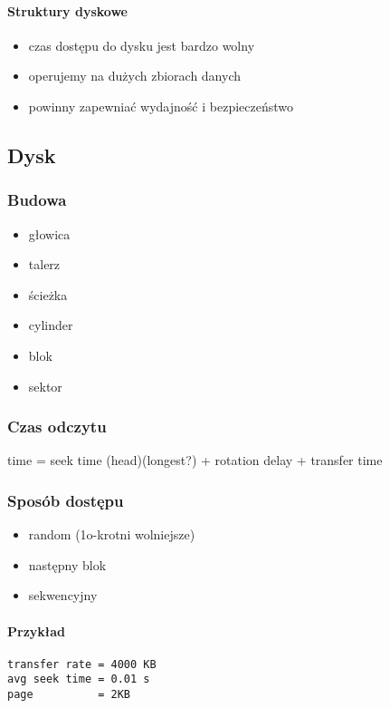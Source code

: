 \documentclass[12pt]{article}
\begin{document}
\paragraph{Struktury dyskowe}
\begin{itemize}
\item czas dostępu do dysku jest bardzo wolny
\item operujemy na dużych zbiorach danych
\item powinny zapewniać wydajność i bezpieczeństwo
\end{itemize}

\subsection{Dysk}
\subsubsection{Budowa}
\begin{itemize}
\item głowica
\item talerz
\item ścieżka
\item cylinder
\item blok
\item sektor
\end{itemize}

\subsubsection{Czas odczytu}
time = seek time (head)(longest?) + rotation delay + transfer time

\subsubsection{Sposób dostępu}
\begin{itemize}
\item random (1o-krotni wolniejsze)
\item następny blok
\item sekwencyjny
\end{itemize}

\paragraph{Przykład}
\begin{verbatim}
transfer rate = 4000 KB
avg seek time = 0.01 s
page          = 2KB
\end{verbatim}
\end{document}
